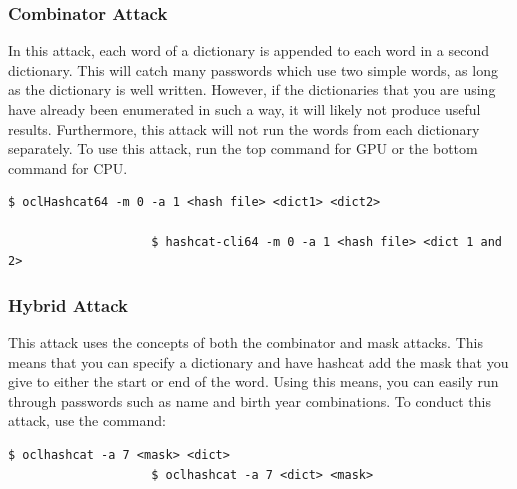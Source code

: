 			\subsubsection{Combinator Attack}
				In this attack, each word of a dictionary is appended to each word in a second dictionary. 
				This will catch many passwords which use two simple words, as long as the dictionary is well written. 
				However, if the dictionaries that you are using have already been enumerated in such a way, it will likely not produce useful results. 
				Furthermore, this attack will not run the words from each dictionary separately. 
				To use this attack, run the top command for GPU or the bottom command for CPU. 
				\begin{lstlisting}[style=CLI]
					$ oclHashcat64 -m 0 -a 1 <hash file> <dict1> <dict2>
					
					$ hashcat-cli64 -m 0 -a 1 <hash file> <dict 1 and 2>
				\end{lstlisting}
			\subsubsection{Hybrid Attack}
				This attack uses the concepts of both the combinator and mask attacks. 
				This means that you can specify a dictionary and have hashcat add the mask that you give to either the start or end of the word. 
				Using this means, you can easily run through passwords such as name and birth year combinations. 
				To conduct this attack, use the command:
				\begin{lstlisting}[style=CLI]
					$ oclhashcat -a 7 <mask> <dict>
					$ oclhashcat -a 7 <dict> <mask>
				\end{lstlisting}
				
